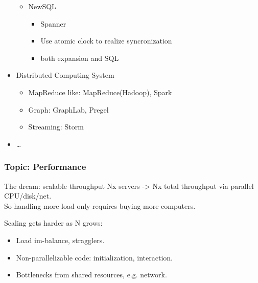 \begin{frame}[allowframebreaks]
\begin{itemize}
\begin{itemize}
\begin{itemize}
            \end{itemize}
            \item NewSQL
            \begin{itemize}
                \item Spanner
                \item Use atomic clock to realize syncronization
                \item both expansion and SQL
            \end{itemize}
        \end{itemize}
        \item Distributed Computing System
        \begin{itemize}
            \item MapReduce like: MapReduce(Hadoop), Spark
            \item Graph: GraphLab, Pregel
            \item Streaming: Storm
        \end{itemize}
        \item \ldots
    \end{itemize}
\end{frame}

\begin{frame}
    \frametitle{Topic: Performance}
    \begin{block}{The dream: scalable throughput}
        Nx servers -> Nx total throughput via parallel CPU/disk/net. \\
        So handling more load only requires buying more computers.
    \end{block}
    Scaling gets harder as N grows:
    \begin{itemize}
        \item Load im-balance, stragglers.
        \item Non-parallelizable code: initialization, interaction.
        \item Bottlenecks from shared resources, e.g. network.
    \end{itemize}
\end{frame}

